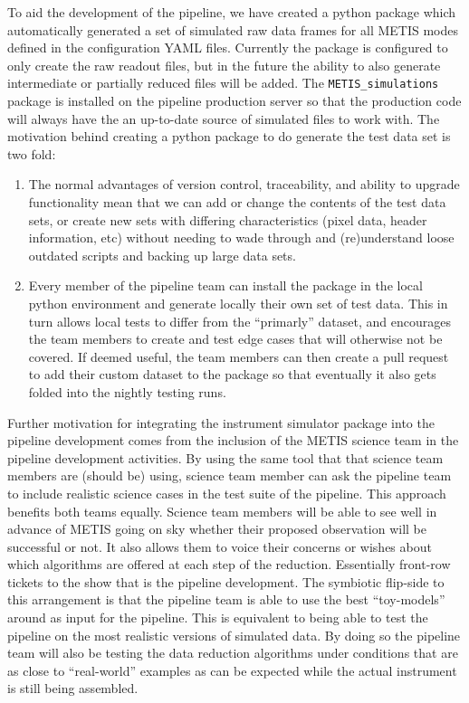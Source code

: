 \documentclass[a4paper]{spie}  %
\begin{document}
To aid the development of the pipeline, we have created a python package which automatically generated a set of simulated raw data frames for all METIS modes defined in the configuration YAML files.
Currently the package is configured to only create the raw readout files, but in the future the ability to also generate intermediate or partially reduced files will be added.
The \verb+METIS_simulations+ package is installed on the pipeline production server so that the production code will always have the an up-to-date source of simulated files to work with.
The motivation behind creating a python package to do generate the test data set is two fold:
\begin{enumerate}
    \item The normal advantages of version control, traceability, and ability to upgrade functionality mean that we can add or change the contents of the test data sets, or create new sets with differing characteristics (pixel data, header information, etc) without needing to wade through and (re)understand loose outdated scripts and backing up large data sets.
    \item Every member of the pipeline team can install the package in the local python environment and generate locally their own set of test data. This in turn allows local tests to differ from the ``primarly'' dataset, and encourages the team members to create and test edge cases that will otherwise not be covered. If deemed useful, the team members can then create a pull request to add their custom dataset to the package so that eventually it also gets folded into the nightly testing runs.
\end{enumerate}

Further motivation for integrating the instrument simulator package into the pipeline development comes from the inclusion of the METIS science team in the pipeline development activities.
By using the same tool that that science team members are (should be) using, science team member can ask the pipeline team to include realistic science cases in the test suite of the pipeline.
This approach benefits both teams equally.
Science team members will be able to see well in advance of METIS going on sky whether their proposed observation will be successful or not. 
It also allows them to voice their concerns or wishes about which algorithms are offered at each step of the reduction.
Essentially front-row tickets to the show that is the pipeline development.
The symbiotic flip-side to this arrangement is that the pipeline team is able to use the best ``toy-models'' around as input for the pipeline.
This is equivalent to being able to test the pipeline on the most realistic versions of simulated data.
By doing so the pipeline team will also be testing the data reduction algorithms under conditions that are as close to ``real-world'' examples as can be expected while the actual instrument is still being assembled.
\end{document}
